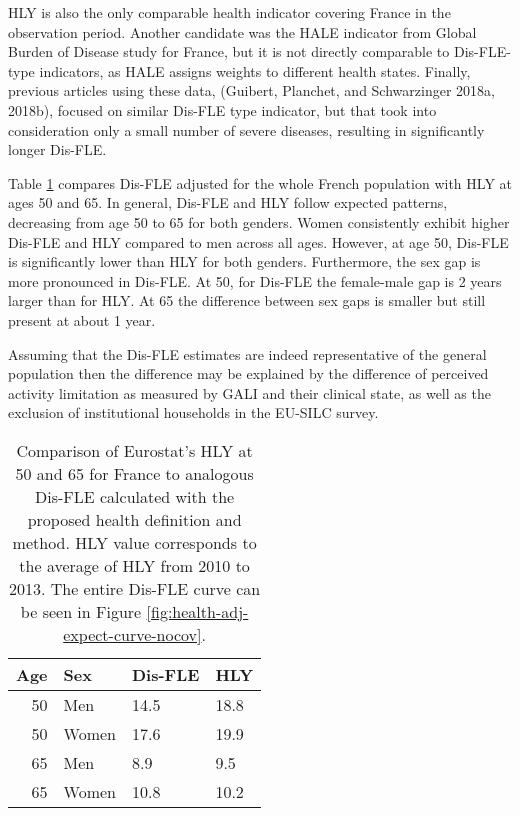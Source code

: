 \documentclass{article}
\begin{document}
HLY is also the only comparable health indicator covering France in the
observation period. Another candidate was the HALE indicator from Global
Burden of Disease study for France, but it is not directly comparable to
Dis-FLE-type indicators, as HALE assigns weights to different health
states. Finally, previous articles using these data, (Guibert, Planchet,
and Schwarzinger 2018a, 2018b), focused on similar Dis-FLE type
indicator, but that took into consideration only a small number of
severe diseases, resulting in significantly longer Dis-FLE.

Table \ref{tab:hly-comparaison} compares Dis-FLE adjusted for the whole
French population with HLY at ages 50 and 65. In general, Dis-FLE and
HLY follow expected patterns, decreasing from age 50 to 65 for both
genders. Women consistently exhibit higher Dis-FLE and HLY compared to
men across all ages. However, at age 50, Dis-FLE is significantly lower
than HLY for both genders. Furthermore, the sex gap is more pronounced
in Dis-FLE. At 50, for Dis-FLE the female-male gap is 2 years larger
than for HLY. At 65 the difference between sex gaps is smaller but still
present at about 1 year.

Assuming that the Dis-FLE estimates are indeed representative of the
general population then the difference may be explained by the
difference of perceived activity limitation as measured by GALI and
their clinical state, as well as the exclusion of institutional
households in the EU-SILC survey.

\begin{table}

\caption{\label{tab:hly-comparaison}
            Comparison of Eurostat's HLY at 50 and 65 for France to analogous
            Dis-FLE calculated with the proposed health definition and method.
            HLY value corresponds to the average of HLY from 2010 to 2013.
            The entire Dis-FLE curve can be seen in Figure \ref{fig:health-adj-expect-curve-nocov}.
        }
\centering
\begin{tabular}[t]{rlll}
\toprule
Age & Sex & Dis-FLE & HLY\\
\midrule
50 & Men & 14.5 & 18.8\\
50 & Women & 17.6 & 19.9\\
65 & Men & 8.9 & 9.5\\
65 & Women & 10.8 & 10.2\\
\bottomrule
\end{tabular}
\end{table}
\end{document}
